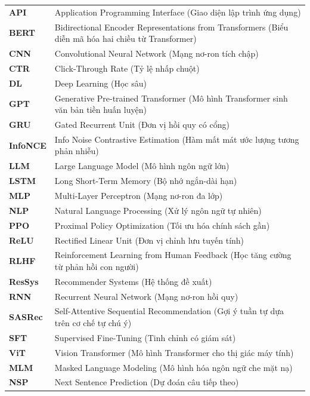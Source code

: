 \begin{longtable}{@{} p{2.5cm} p{12.5cm} @{}}
    \textbf{API} & Application Programming Interface (Giao diện lập trình ứng dụng) \\
    \textbf{BERT} & Bidirectional Encoder Representations from Transformers (Biểu diễn mã hóa hai chiều từ Transformer) \\
    \textbf{CNN} & Convolutional Neural Network (Mạng nơ-ron tích chập) \\
    \textbf{CTR} & Click-Through Rate (Tỷ lệ nhấp chuột) \\
    \textbf{DL} & Deep Learning (Học sâu) \\
    \textbf{GPT} & Generative Pre-trained Transformer (Mô hình Transformer sinh văn bản tiền huấn luyện) \\
    \textbf{GRU} & Gated Recurrent Unit (Đơn vị hồi quy có cổng) \\
    \textbf{InfoNCE} & Info Noise Contrastive Estimation (Hàm mất mát ước lượng tương phản nhiễu) \\
    \textbf{LLM} & Large Language Model (Mô hình ngôn ngữ lớn) \\
    \textbf{LSTM} & Long Short-Term Memory (Bộ nhớ ngắn-dài hạn) \\
    \textbf{MLP} & Multi-Layer Perceptron (Mạng nơ-ron đa lớp) \\
    \textbf{NLP} & Natural Language Processing (Xử lý ngôn ngữ tự nhiên) \\
    \textbf{PPO} & Proximal Policy Optimization (Tối ưu hóa chính sách gần) \\
    \textbf{ReLU} & Rectified Linear Unit (Đơn vị chỉnh lưu tuyến tính) \\
    \textbf{RLHF} & Reinforcement Learning from Human Feedback (Học tăng cường từ phản hồi con người) \\
    \textbf{ResSys} & Recommender Systems (Hệ thống đề xuất) \\
    \textbf{RNN} & Recurrent Neural Network (Mạng nơ-ron hồi quy) \\
    \textbf{SASRec} & Self-Attentive Sequential Recommendation (Gợi ý tuần tự dựa trên cơ chế tự chú ý) \\
    \textbf{SFT} & Supervised Fine-Tuning (Tinh chỉnh có giám sát) \\
    \textbf{ViT} & Vision Transformer (Mô hình Transformer cho thị giác máy tính) \\
    \textbf{MLM} & Masked Language Modeling (Mô hình hóa ngôn ngữ che mặt nạ) \\
    \textbf{NSP} & Next Sentence Prediction (Dự đoán câu tiếp theo) \\
    
\end{longtable}
\endgroup